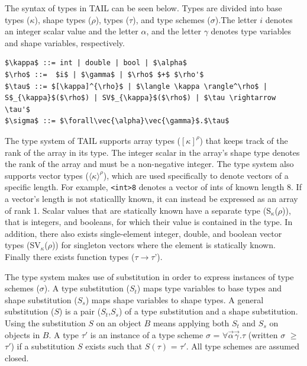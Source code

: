 \documentclass[11pt]{article}
\begin{document}
The syntax of types in TAIL can be seen below. Types are divided into base types ($\kappa$), shape types ($\rho$), types ($\tau$), and type schemes ($\sigma$).The letter $i$ denotes an integer scalar value and the letter $\alpha$, and the letter $\gamma$ denotes type variables and shape variables, respectively.
\begin{lstlisting}[numbers=none,frame=none]
$\kappa$ ::= int | double | bool | $\alpha$
$\rho$ ::=  $i$ | $\gamma$ | $\rho$ $+$ $\rho'$
$\tau$ ::= $[\kappa]^{\rho}$ | $\langle \kappa \rangle^\rho$ | S$_{\kappa}$($\rho$) | SV$_{\kappa}$($\rho$) | $\tau \rightarrow \tau'$
$\sigma$ ::= $\forall\vec{\alpha}\vec{\gamma}$.$\tau$
\end{lstlisting}
The type system of TAIL supports array types ($[\kappa]^{\rho}$) that keeps track of the rank of the array in its type.
The integer scalar in the array's shape type denotes the rank of the array and must be a non-negative integer.
The type system also supports vector types ($\langle \kappa \rangle^\rho$), which are used specifically to denote vectors of a specific length. For example, {\tt <int>8} denotes a vector of ints of known length 8. If a vector's length is not staticallly known, it can instead be expressed as an array of rank 1.
Scalar values that are statically known have a separate type (S$_{\kappa}$($\rho$)), that is integers, and booleans,
for which their value is contained in the type.
In addition, there also exists single-element integer, double, and boolean vector types (SV$_{\kappa}$($\rho$)) for singleton vectors where the element is statically known.
Finally there exists function types ($\tau \rightarrow \tau$').

The type system makes use of substitution in order to express instances of type schemes ($\sigma$).
A type substitution ($S_t$) maps type variables to base types and shape substitution ($S_s$) maps shape variables to shape types.
A general substitution ($S$) is a pair ($S_t$,$S_s$) of a type substitution and a shape substitution.
Using the substitution $S$ on an object $B$ means applying both $S_t$ and $S_s$ on objects in $B$.
A type $\tau'$ is an instance of a type scheme $\sigma$ = $\forall\vec{\alpha}\vec{\gamma}$.$\tau$ (written $\sigma$ $\geq$ $\tau'$) if a substitution $S$ exists such that $S(\tau)$ = $\tau'$. All type schemes are assumed closed.
\end{document}
